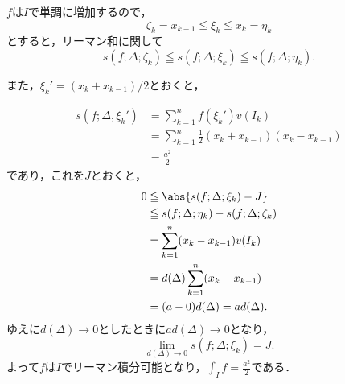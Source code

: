 \documentclass[a4paper,10pt,fleqn]{ltjsarticle}
\begin{document}
    \begin{tleftbar}
        $f$は$I$で単調に増加するので，
        \[
        \zeta_k = x_{k-1} \leqq \xi_k \leqq x_k=\eta_k 
        \]
        とすると，リーマン和に関して
        \[
        s(f;\Delta ; \zeta_k ) \leqq s(f;\Delta;\xi_k) \leqq s(f;\Delta;\eta_k).
        \]

        また，$\xi_k' = (x_k+x_{k-1} )/2 $とおくと，
        
        \begin{align*}
        s(f;\Delta,\xi_k' )& = \sum_{k=1}^{n} f(\xi_k ') v(I_k) \\
        & =  \sum_{k=1}^{n} \frac{1}{2} (x_k +x_{k-1})(x_k - x_{k-1}) \\
        & = \frac{a^2}{2}
        \end{align*}
        であり，これを$J$とおくと，
        \begin{align*} 
        0 &\leqq \abs{s(f;\Delta; \xi_k)-J }\\
        & \leqq  s(f;\Delta;\eta_k) -s(f;\Delta ; \zeta_k ) \\
        & = \sum_{k=1}^{n} (x_k-x_{k-1} ) v(I_k) \\
        & = d(\Delta) \sum_{k=1}^{n} (x_k-x_{k-1} ) \\
        & = (a-0) d(\Delta)=a d(\Delta).
        \end{align*}
        ゆえに$d (\Delta) \to 0$としたときに$a d(\Delta) \to 0$となり，
        \[
        \lim_{d(\Delta) \to 0} s(f;\Delta; \xi_k)=J.
        \]
        よって$f$は$I$でリーマン積分可能となり，$\int_{I} f = \frac{a^2}{2}$である．
        \end{tleftbar}
        
\end{document}
